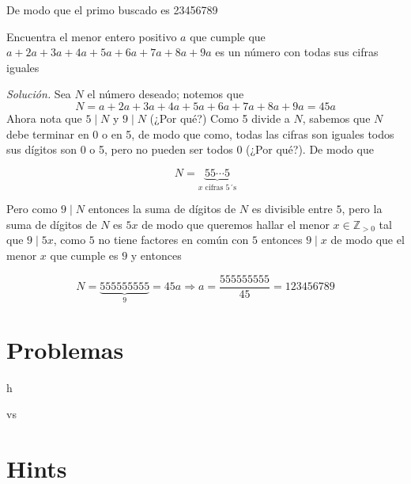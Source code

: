 \documentclass[11pt]{scrartcl}
\begin{document}
De modo que el primo buscado es 23456789

\begin{example}
    Encuentra el menor entero positivo $a$ que cumple que $a + 2a + 3a + 4a + 5a + 6a + 7a + 8a + 9a$ es un número con
todas sus cifras iguales
\end{example}
\textit{Solución.} Sea $N$ el número deseado; notemos que 
\[N=a + 2a + 3a + 4a + 5a + 6a + 7a + 8a + 9a=45a\]
Ahora nota que $5\mid N$ y $9\mid N$ (¿Por qué?)
Como 5 divide a $N$, sabemos que $N$ debe terminar en 0 o en 5, de modo que como, todas las cifras son iguales todos sus dígitos son 0 o 5, pero no pueden ser todos 0 (¿Por qué?). De modo que 

\[N=\underbrace{55\cdots 5}_{\text{$x$ cifras 5´s}}\]

Pero como $9\mid N$ entonces la suma de dígitos de $N$ es divisible entre $5$, pero la suma de dígitos de $N$ es $5x$ de modo que queremos hallar el menor $x\in\mathbb{Z}_{>0}$ tal que $9\mid 5x$, como $5$ no tiene factores en común con $5$ entonces $9\mid x$ de modo que el menor $x$ que cumple es $9$ y entonces

\[N=\underbrace{555555555}_{9}=45a \Rightarrow a=\frac{555555555}{45}=123456789\]

\bigskip
\section{Problemas}
\begin{problem}
h
    \begin{hint}
        vs
    \end{hint}
\end{problem}


\section{Hints}

\begin{enumerate}
  
\end{enumerate}
\end{document}
